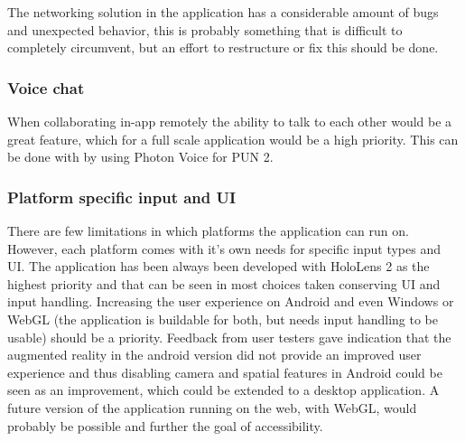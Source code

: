 The networking solution in the application has a considerable amount of bugs and unexpected behavior, this is probably something that is difficult to completely circumvent, but an effort to restructure or fix this should be done.


\subsubsection*{Voice chat}

When collaborating in-app remotely the ability to talk to each other would be a great feature, which for a full scale application would be a high priority. 
This can be done with by using Photon Voice for PUN 2.

\subsubsection*{Platform specific input and UI}
There are few limitations in which platforms the application can run on. However, each platform comes with it's own needs for specific input types and UI. The application has been always been developed with HoloLens 2 as the highest priority and that can be seen in most choices taken conserving UI and input handling. Increasing the user experience on Android and even Windows or WebGL (the application is buildable for both, but needs input handling to be usable) should be a priority. Feedback from user testers gave indication that the augmented reality in the android version did not provide an improved user experience and thus disabling camera and spatial features in Android could be seen as an improvement, which could be extended to a desktop application.
A future version of the application running on the web, with WebGL, would probably be possible and further the goal of accessibility.















